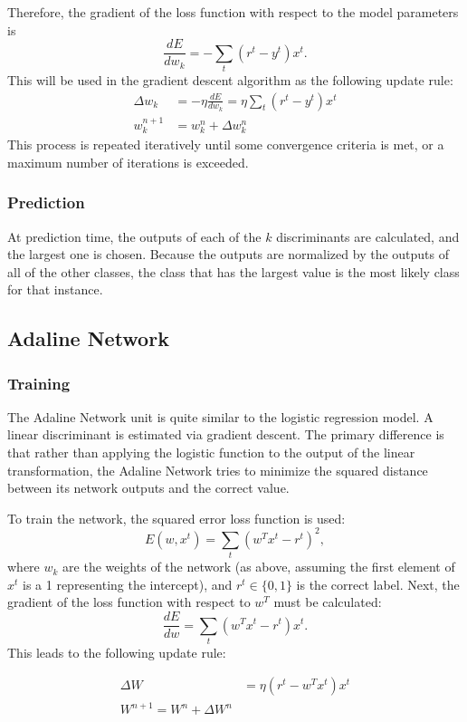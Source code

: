 \documentclass{amsart}
\begin{document}
    Therefore, the gradient of the loss function with respect to the model parameters is
    \[
        \frac{dE}{dw_k} = - \sum_t (r^t - y^t) x^t.
    \]
    This will be used in the gradient descent algorithm as the following update rule:
    \begin{align*}
        \Delta w_k &= -\eta \frac{dE}{dw_k} = \eta \sum_t (r^t - y^t) x^t \\
        w^{n+1}_k &= w^{n}_k + \Delta w^{n}_k
    \end{align*}
    This process is repeated iteratively until some convergence criteria is met, or a maximum number
    of iterations is exceeded.

    \subsubsection*{Prediction}
    At prediction time, the outputs of each of the $k$ discriminants are calculated, and the largest one is chosen.
    Because the outputs are normalized by the outputs of all of the other classes, the class that has the largest
    value is the most likely class for that instance.

    \subsection{Adaline Network}
    \subsubsection*{Training}
    The Adaline Network unit is quite similar to the logistic regression model. A linear
    discriminant is estimated via gradient descent. The primary difference is that rather than
    applying the logistic function to the output of the linear transformation, the Adaline Network
    tries to minimize the squared distance between its network outputs and the correct value.

    To train the network, the squared error loss function is used:
    \[
        E(w, x^t) = \sum_{t}(w^T x^t - r^t)^2,
    \]
    where $w_k$ are the weights of the network (as above, assuming the first element of $x^t$ is a 1 representing the
    intercept), and $r^t \in \{0, 1\}$ is the correct label. Next, the gradient of the loss function  with respect to
    $w^T$ must be calculated:
    \[
        \frac{dE}{dw} = \sum_t (w^T x^t - r^t)x^t.
    \]
    This leads to the following update rule:

    \begin{align*}
        \Delta W &= \eta (r^t - w^T x^t) x^t \\
        W^{n+1} = W^n + \Delta W^{n}
    \end{align*}
\end{document}
